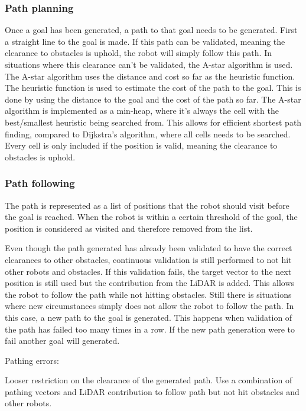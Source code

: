 \subsubsection{Path planning}\label{sec:path_planning}
Once a goal has been generated, a path to that goal needs to be generated. First a straight line to the goal is made. If this path can be validated, meaning the clearance to obstacles is uphold, the robot will simply follow this path.
In situations where this clearance can't be validated, the A-star algorithm is used.
The A-star algorithm uses the distance and cost so far as the heuristic function. The heuristic function is used to estimate the cost of the path to the goal. This is done by using the distance to the goal and the cost of the path so far.
The A-star algorithm is implemented as a min-heap, where it's always the cell with the best/smallest heuristic being searched from. This allows for efficient shortest path finding, compared to Dijkstra's algorithm, where all cells needs to be searched. Every cell is only included if the position is valid, meaning the clearance to obstacles is uphold.

\subsubsection{Path following}\label{sec:path_following}
The path is represented as a list of positions that the robot should visit before the goal is reached. When the robot is within a certain threshold of the goal, the position is considered as visited and therefore removed from the list.

Even though the path generated has already been validated to have the correct clearances to other obstacles, continuous validation is still performed to not hit other robots and obstacles.
If this validation fails, the target vector to the next position is still used but the contribution from the LiDAR is added. This allows the robot to follow the path while not hitting obstacles. 
Still there is situations where new circumstances simply does not allow the robot to follow the path. In this case, a new path to the goal is generated. This happens when validation of the path has failed too many times in a row. If the new path generation were to fail another goal will generated.

Pathing errors:

Looser restriction on the clearance of the generated path.
Use a combination of pathing vectors and LiDAR contribution to follow path but not hit obstacles and other robots.
